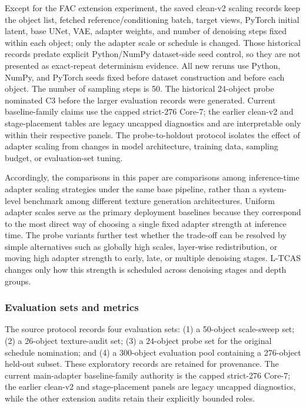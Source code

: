 \documentclass[times,twocolumn,final]{elsarticle}
\begin{document}
Except for the FAC extension experiment, the saved clean-v2 scaling records keep the object list, fetched reference/conditioning batch, target views, PyTorch initial latent, base UNet, VAE, adapter weights, and number of denoising steps fixed within each object; only the adapter scale or schedule is changed. Those historical records predate explicit Python/NumPy dataset-side seed control, so they are not presented as exact-repeat determinism evidence. All new reruns use Python, NumPy, and PyTorch seeds fixed before dataset construction and before each object. The number of sampling steps is 50. The historical 24-object probe nominated C3 before the larger evaluation records were generated. Current baseline-family claims use the capped strict-276 Core-7; the earlier clean-v2 and stage-placement tables are legacy uncapped diagnostics and are interpretable only within their respective panels. The probe-to-holdout protocol isolates the effect of adapter scaling from changes in model architecture, training data, sampling budget, or evaluation-set tuning.

Accordingly, the comparisons in this paper are comparisons among inference-time adapter scaling strategies under the same base pipeline, rather than a system-level benchmark among different texture generation architectures. Uniform adapter scales serve as the primary deployment baselines because they correspond to the most direct way of choosing a single fixed adapter strength at inference time. The probe variants further test whether the trade-off can be resolved by simple alternatives such as globally high scales, layer-wise redistribution, or moving high adapter strength to early, late, or multiple denoising stages. L-TCAS changes only how this strength is scheduled across denoising stages and depth groups.

\subsubsection{Evaluation sets and metrics}

The source protocol records four evaluation sets: (1) a 50-object scale-sweep set; (2) a 26-object texture-audit set; (3) a 24-object probe set for the original schedule nomination; and (4) a 300-object evaluation pool containing a 276-object held-out subset. These exploratory records are retained for provenance. The current main-adapter baseline-family authority is the capped strict-276 Core-7; the earlier clean-v2 and stage-placement panels are legacy uncapped diagnostics, while the other extension audits retain their explicitly bounded roles.
\end{document}

